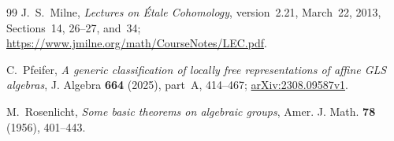 \documentclass[11pt, reqno]{amsart}
\numberwithin{equation}{section}
\theoremstyle{definition}
\theoremstyle{remark}
\begin{document}
\begin{thebibliography}{99}
J.~S.~Milne,
\emph{Lectures on \'Etale Cohomology},
version~2.21, March~22, 2013, Sections~14, 26--27, and~34;
\url{https://www.jmilne.org/math/CourseNotes/LEC.pdf}.

C.~Pfeifer,
\emph{A generic classification of locally free representations of
affine GLS algebras},
J. Algebra \textbf{664} (2025), part~A, 414--467;
\href{https://arxiv.org/abs/2308.09587v1}{arXiv:2308.09587v1}.

M.~Rosenlicht,
\emph{Some basic theorems on algebraic groups},
Amer. J. Math. \textbf{78} (1956), 401--443.

\end{thebibliography}
\end{document}

